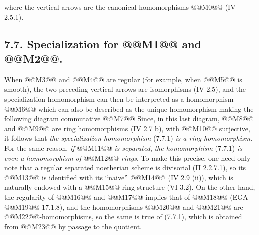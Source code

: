 
where the vertical arrows are the canonical homomorphisms @@M0@@ (IV 2.5.1).

\subsection*{7.7. Specialization for @@M1@@ and @@M2@@.}
When @@M3@@ and @@M4@@ are regular (for example, when @@M5@@ is smooth), the two preceding vertical arrows are isomorphisms (IV 2.5), and the specialization homomorphism can then be interpreted as a homomorphism
@@M6@@
which can also be described as the unique homomorphism making the following diagram commutative
@@M7@@
Since, in this last diagram, @@M8@@ and @@M9@@ are ring homomorphisms (IV 2.7 b), with @@M10@@ surjective, it follows that \emph{the specialization homomorphism} (7.7.1) \emph{is a ring homomorphism}. For the same reason, \emph{if} @@M11@@ \emph{is separated}, \emph{the homomorphism} (7.7.1) \emph{is even a homomorphism of} @@M12@@-\emph{rings}. To make this precise, one need only note that a regular separated noetherian scheme is divisorial (II 2.2.7.1), so its @@M13@@ is identified with its ``naive'' @@M14@@ (IV 2.9 (ii)), which is naturally endowed with a @@M15@@-ring structure (VI 3.2). On the other hand, the regularity of @@M16@@ and @@M17@@ implies that of @@M18@@ (EGA @@M19@@ 17.1.8), and the homomorphisms @@M20@@ and @@M21@@ are @@M22@@-homomorphisms, so the same is true of (7.7.1), which is obtained from @@M23@@ by passage to the quotient.
